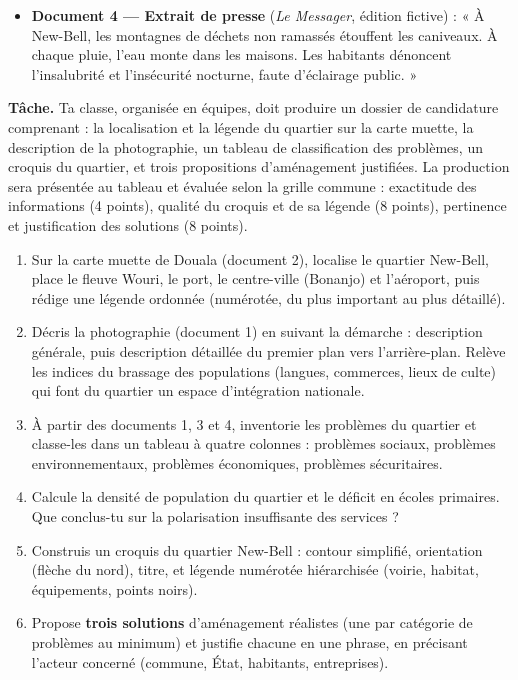 \documentclass[11pt]{article}
\newcommand{\cle}[1]{{\popxbold\color{popdark}#1}}
\newcounter{popsec}
\newcounter{popsub}
\newcommand{\courssub}[1]{%
  \stepcounter{popsub}%
  \par\vspace{9pt}\noindent{\popxbold\fontsize{11.5}{13}\selectfont\color{popink}{\color{poporange}\thepopsec.\thepopsub}\hspace{6pt}#1}\par\nopagebreak\vspace{4pt}
}
\begin{document}
\begin{itemize}
\item \textbf{Document 4 — Extrait de presse} (\emph{Le Messager}, édition fictive) : « À New-Bell, les montagnes de déchets non ramassés étouffent les caniveaux. À chaque pluie, l'eau monte dans les maisons. Les habitants dénoncent l'insalubrité et l'insécurité nocturne, faute d'éclairage public. »
\end{itemize}

\textbf{Tâche.} Ta classe, organisée en équipes, doit produire un dossier de candidature comprenant : la localisation et la légende du quartier sur la carte muette, la description de la photographie, un tableau de classification des problèmes, un croquis du quartier, et trois propositions d'aménagement justifiées. La production sera présentée au tableau et évaluée selon la grille commune : exactitude des informations (4 points), qualité du croquis et de sa légende (8 points), pertinence et justification des solutions (8 points).

\courssub{Consignes}

\begin{enumerate}
\item Sur la carte muette de Douala (document 2), localise le quartier New-Bell, place le fleuve Wouri, le port, le centre-ville (Bonanjo) et l'aéroport, puis rédige une \cle{légende ordonnée} (numérotée, du plus important au plus détaillé).
\item Décris la photographie (document 1) en suivant la démarche : description générale, puis description détaillée du premier plan vers l'arrière-plan. Relève les indices du \cle{brassage des populations} (langues, commerces, lieux de culte) qui font du quartier un espace d'intégration nationale.
\item À partir des documents 1, 3 et 4, inventorie les problèmes du quartier et classe-les dans un tableau à quatre colonnes : problèmes sociaux, problèmes environnementaux, problèmes économiques, problèmes sécuritaires.
\item Calcule la \cle{densité de population} du quartier et le déficit en écoles primaires. Que conclus-tu sur la polarisation insuffisante des services ?
\item Construis un \cle{croquis} du quartier New-Bell : contour simplifié, orientation (flèche du nord), titre, et légende numérotée hiérarchisée (voirie, habitat, équipements, points noirs).
\item Propose \textbf{trois solutions} d'aménagement réalistes (une par catégorie de problèmes au minimum) et justifie chacune en une phrase, en précisant l'acteur concerné (commune, État, habitants, entreprises).
\end{enumerate}
\end{document}
